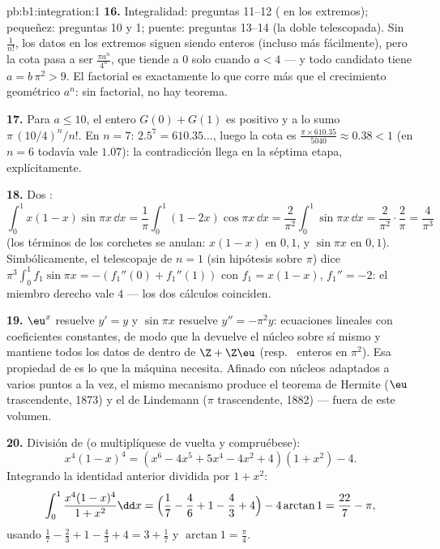 \begin{solution}{pb:b1:integration:1}
\textbf{16.} Integralidad: preguntas 11--12 ( en los
extremos); pequeñez: preguntas 10 y 1; puente: preguntas 13--14 (la
doble  telescopada). Sin $\frac{1}{n!}$, los
datos en los extremos siguen siendo enteros (incluso más
fácilmente), pero la cota pasa a ser $\frac{\pi a^n}{4^n}$, que
tiende a $0$ solo cuando $a < 4$ --- y todo candidato tiene
$a = b\,\pi^2 > 9$. El factorial es exactamente lo que corre más que
el crecimiento geométrico $a^n$: sin factorial, no hay teorema.

\textbf{17.} Para $a \leq 10$, el entero $G(0) + G(1)$ es positivo y
a lo sumo $\pi\,(10/4)^n/n!$. En $n = 7$: $2.5^7 = 610.35\dots$,
luego la cota es $\frac{\pi \times 610.35}{5040} \approx 0.38 < 1$
(en $n = 6$ todavía vale $1.07$): la contradicción llega en la
séptima etapa, explícitamente.

\textbf{18.} Dos :
\[
\int_0^1 x(1-x)\sin\pi x\,\dd x
= \frac1\pi\int_0^1 (1 - 2x)\cos\pi x\,\dd x
= \frac{2}{\pi^2}\int_0^1 \sin\pi x\,\dd x
= \frac{2}{\pi^2}\cdot\frac{2}{\pi} = \frac{4}{\pi^3}
\]
(los términos de los corchetes se anulan: $x(1-x)$ en $0, 1$, y
$\sin\pi x$ en $0, 1$). Simbólicamente, el telescopaje de $n = 1$
(sin hipótesis sobre $\pi$) dice
$\pi^3\int_0^1 f_1\sin\pi x = -(f_1''(0) + f_1''(1))$ con
$f_1 = x(1 - x)$, $f_1'' = -2$: el miembro derecho vale $4$ --- los
dos cálculos coinciden.

\textbf{19.} $\eu^x$ resuelve $y' = y$ y $\sin\pi x$ resuelve
$y'' = -\pi^2 y$: ecuaciones lineales con coeficientes constantes,
de modo que la  devuelve el núcleo sobre sí
mismo y mantiene todos los datos de  dentro de
$\Z + \Z\eu$ (resp.\  enteros en $\pi^2$). Esa propiedad de
 es lo que la máquina necesita. Afinado con núcleos
adaptados a varios puntos a la vez, el mismo mecanismo produce el
teorema de Hermite ($\eu$ trascendente, 1873) y el de Lindemann
($\pi$ trascendente, 1882) --- fuera de este volumen.

\textbf{20.} División de  (o multiplíquese de vuelta y compruébese):
\[
x^4(1-x)^4 = (x^6 - 4x^5 + 5x^4 - 4x^2 + 4)(1 + x^2) - 4 .
\]
Integrando la identidad anterior dividida por $1 + x^2$:
\[
\int_0^1 \frac{x^4(1-x)^4}{1+x^2}\dd x
= \Bigl(\frac17 - \frac46 + 1 - \frac43 + 4\Bigr)
- 4\arctan 1
= \frac{22}{7} - \pi ,
\]
usando $\frac17 - \frac23 + 1 - \frac43 + 4 = 3 + \frac17$ y
$\arctan 1 = \frac\pi4$.


\end{solution}
